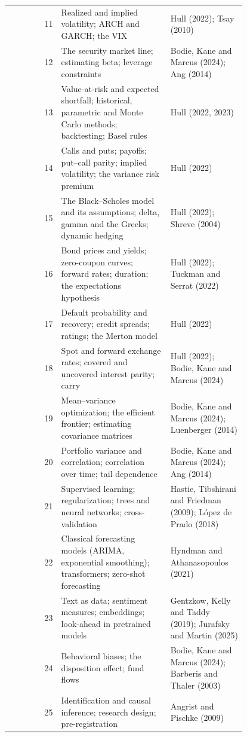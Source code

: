 \begin{longtable}{@{}r>{\raggedright\arraybackslash}p{0.468\linewidth}>{\raggedright\arraybackslash}p{0.324\linewidth}@{}}
11 & Realized and implied volatility; ARCH and GARCH; the VIX & Hull (2022); Tsay (2010) \\
12 & The security market line; estimating beta; leverage constraints & Bodie, Kane and Marcus (2024); Ang (2014) \\
13 & Value-at-risk and expected shortfall; historical, parametric and Monte Carlo methods; backtesting; Basel rules & Hull (2022, 2023) \\
14 & Calls and puts; payoffs; put--call parity; implied volatility; the variance risk premium & Hull (2022) \\
15 & The Black--Scholes model and its assumptions; delta, gamma and the Greeks; dynamic hedging & Hull (2022); Shreve (2004) \\
16 & Bond prices and yields; zero-coupon curves; forward rates; duration; the expectations hypothesis & Hull (2022); Tuckman and Serrat (2022) \\
17 & Default probability and recovery; credit spreads; ratings; the Merton model & Hull (2022) \\
18 & Spot and forward exchange rates; covered and uncovered interest parity; carry & Hull (2022); Bodie, Kane and Marcus (2024) \\
19 & Mean--variance optimization; the efficient frontier; estimating covariance matrices & Bodie, Kane and Marcus (2024); Luenberger (2014) \\
20 & Portfolio variance and correlation; correlation over time; tail dependence & Bodie, Kane and Marcus (2024); Ang (2014) \\
21 & Supervised learning; regularization; trees and neural networks; cross-validation & Hastie, Tibshirani and Friedman (2009); L\'opez de Prado (2018) \\
22 & Classical forecasting models (ARIMA, exponential smoothing); transformers; zero-shot forecasting & Hyndman and Athanasopoulos (2021) \\
23 & Text as data; sentiment measures; embeddings; look-ahead in pretrained models & Gentzkow, Kelly and Taddy (2019); Jurafsky and Martin (2025) \\
24 & Behavioral biases; the disposition effect; fund flows & Bodie, Kane and Marcus (2024); Barberis and Thaler (2003) \\
25 & Identification and causal inference; research design; pre-registration & Angrist and Pischke (2009) \\
\end{longtable}
\endgroup

